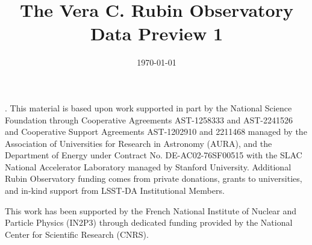 \documentclass[twocolumn,  twocolappendix,trackchanges]{aastex7}
\begin{document}
\date{\today}
\title{The Vera C. Rubin Observatory Data Preview 1}
















\begin{acknowledgments}.
This material is based upon work supported in part by the National Science Foundation through Cooperative Agreements AST-1258333 and AST-2241526 and Cooperative Support Agreements AST-1202910 and 2211468 managed by the Association of Universities for Research in Astronomy (AURA), and the Department of Energy under Contract No. DE-AC02-76SF00515 with the SLAC National Accelerator Laboratory managed by Stanford University. 
Additional Rubin Observatory funding comes from private donations, grants to universities, and in-kind support from LSST-DA Institutional Members.

This work has been supported by the French National Institute of Nuclear and Particle Physics (IN2P3) through dedicated funding provided by the National Center for Scientific Research (CNRS).
\end{acknowledgments}
\vspace{5mm}



\appendix
\printglossaries



\end{document}
